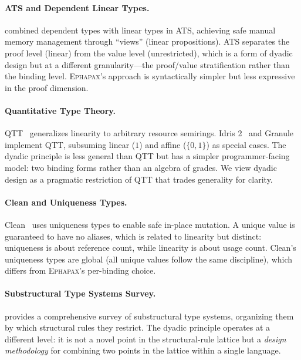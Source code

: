 \documentclass[11pt,a4paper]{article}
\newcommand{\Ephapax}{\textsc{Ephapax}}
\begin{document}
\paragraph{ATS and Dependent Linear Types.}
\citet{xi2017applied} combined dependent types with linear types in ATS,
achieving safe manual memory management through ``views'' (linear propositions).
ATS separates the proof level (linear) from the value level (unrestricted),
which is a form of dyadic design but at a different granularity---the proof/value
stratification rather than the binding level. \Ephapax{}'s approach is
syntactically simpler but less expressive in the proof dimension.

\paragraph{Quantitative Type Theory.}
QTT~\citep{atkey2018syntax,mcbride2016got} generalizes linearity to arbitrary
resource semirings. Idris 2~\citep{brady2021idris2} and Granule~\citep{orchard2019quantitative}
implement QTT, subsuming linear ($1$) and affine ($\{0,1\}$) as special cases.
The dyadic principle is less general than QTT but has a simpler programmer-facing
model: two binding forms rather than an algebra of grades. We view dyadic design
as a pragmatic restriction of QTT that trades generality for clarity.

\paragraph{Clean and Uniqueness Types.}
Clean~\citep{barendsen1996uniqueness} uses uniqueness types to enable safe
in-place mutation. A unique value is guaranteed to have no aliases, which is
related to linearity but distinct: uniqueness is about reference count, while
linearity is about usage count. Clean's uniqueness types are global (all unique
values follow the same discipline), which differs from \Ephapax{}'s per-binding
choice.

\paragraph{Substructural Type Systems Survey.}
\citet{walker2005substructural} provides a comprehensive survey of substructural
type systems, organizing them by which structural rules they restrict. The dyadic
principle operates at a different level: it is not a novel point in the
structural-rule lattice but a \emph{design methodology} for combining two points
in the lattice within a single language.
\end{document}
